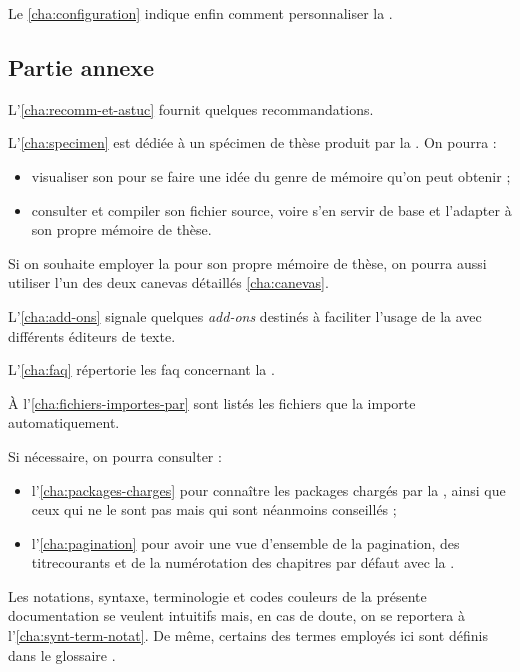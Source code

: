 Le \vref{cha:configuration} indique enfin comment personnaliser la \yatcl{}.

\subsection{Partie annexe}
\label{sec:partie-annexe}

L'\vref{cha:recomm-et-astuc} fournit quelques recommandations.

L'\vref{cha:specimen} est dédiée à un spécimen de thèse produit par la
\yatcl{}. On pourra :
\begin{itemize}
\item visualiser son  pour se faire une idée du genre de mémoire
  qu'on peut obtenir ;
\item consulter et compiler son fichier source, voire s'en servir de base et
  l'adapter à son propre mémoire de thèse.
\end{itemize}

Si on souhaite employer la \yatcl{} pour son propre mémoire de thèse, on pourra
aussi utiliser l'un des deux canevas détaillés \vref{cha:canevas}.

L'\vref{cha:add-ons} signale quelques \emph{add-ons} destinés à faciliter
l'usage de la \yatcl{} avec différents éditeurs de texte.

L'\vref{cha:faq} répertorie les \acrshort{faq} concernant la \yatcl{}.

À l'\vref{cha:fichiers-importes-par} sont listés les fichiers que la \yatcl{}
importe automatiquement.

Si nécessaire, on pourra consulter :
\begin{itemize}
\item l'\vref{cha:packages-charges} pour connaître les packages chargés par la
  \yatcl{}, ainsi que ceux qui ne le sont pas mais qui sont néanmoins
  conseillés ;
\item l'\vref{cha:pagination} pour avoir une vue d'ensemble de la
  \gls{pagination}, des \glspl{titrecourant} et de la numérotation des
  chapitres par défaut avec la \yatcl{}.
\end{itemize}

Les notations, syntaxe, terminologie et codes couleurs de la présente
documentation se veulent intuitifs mais, en cas de doute, on se reportera
à l'\vref{cha:synt-term-notat}. De même, certains des termes employés ici sont
définis dans le glossaire .

